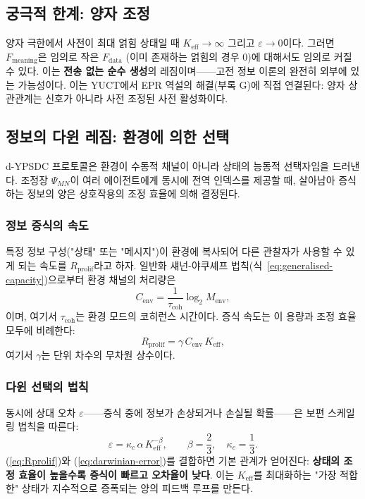 \documentclass[12pt,a4paper]{article}
\newcommand{\Keff}{K_{\mathrm{eff}}}
\begin{document}
	\subsection{궁극적 한계: 양자 조정}
	
	양자 극한에서 사전이 최대 얽힘 상태일 때 $\Keff \to \infty$ 그리고 $\varepsilon \to 0$이다. 그러면 $F_{\text{meaning}}$은 임의로 작은 $F_{\text{data}}$ (이미 존재하는 얽힘의 경우 0)에 대해서도 임의로 커질 수 있다. 이는 \textbf{전송 없는 순수 생성}의 레짐이며——고전 정보 이론의 완전히 외부에 있는 가능성이다. 이는 YUCT에서 EPR 역설의 해결(부록 G)에 직접 연결된다: 양자 상관관계는 신호가 아니라 사전 조정된 사전 활성화이다.
	
	\subsection{정보의 다윈 레짐: 환경에 의한 선택}
	\label{subsec:darwinian-regime}
	
	d-YPSDC 프로토콜은 환경이 수동적 채널이 아니라 상태의 능동적 선택자임을 드러낸다. 조정장 $\Psi_{MN}$이 여러 에이전트에게 동시에 전역 인덱스를 제공할 때, 살아남아 증식하는 정보의 양은 상호작용의 조정 효율에 의해 결정된다.
	
	\subsubsection*{정보 증식의 속도}
	특정 정보 구성("상태" 또는 "메시지")이 환경에 복사되어 다른 관찰자가 사용할 수 있게 되는 속도를 $R_{\mathrm{prolif}}$라고 하자. 일반화 섀넌-야쿠셰프 법칙(식~\ref{eq:generalised-capacity})으로부터 환경 채널의 처리량은
	\[
	C_{\mathrm{env}} = \frac{1}{\tau_{\mathrm{coh}}} \log_2 M_{\mathrm{env}},
	\]
	이며, 여기서 $\tau_{\mathrm{coh}}$는 환경 모드의 코히런스 시간이다. 증식 속도는 이 용량과 조정 효율 모두에 비례한다:
	\begin{equation}
		R_{\mathrm{prolif}} = \gamma \, C_{\mathrm{env}} \, K_{\mathrm{eff}},
		\label{eq:Rprolif}
	\end{equation}
	여기서 $\gamma$는 단위 차수의 무차원 상수이다.
	
	\subsubsection*{다윈 선택의 법칙}
	동시에 상대 오차 $\varepsilon$——증식 중에 정보가 손상되거나 손실될 확률——은 보편 스케일링 법칙을 따른다:
	\begin{equation}
		\varepsilon = \kappa_c \, \alpha \, K_{\mathrm{eff}}^{-\beta},
		\qquad \beta = \frac{2}{3},\quad \kappa_c = \frac{1}{3}.
		\label{eq:darwinian-error}
	\end{equation}
	(\ref{eq:Rprolif})와 (\ref{eq:darwinian-error})를 결합하면 기본 관계가 얻어진다: \textbf{상태의 조정 효율이 높을수록 증식이 빠르고 오차율이 낮다}. 이는 $K_{\mathrm{eff}}$를 최대화하는 "가장 적합한" 상태가 지수적으로 증폭되는 양의 피드백 루프를 만든다.
	
\end{document}
